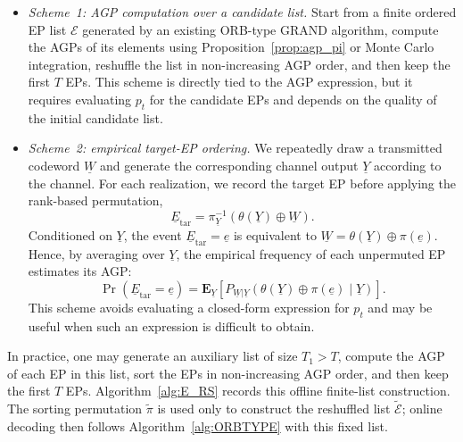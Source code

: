 \documentclass[letterpaper,draftclsnofoot,onecolumn]{IEEEtran}
\begin{document}
\begin{itemize}
    \item \textit{Scheme~1: AGP computation over a candidate list.}
    Start from a finite ordered EP list $\mathcal{E}$ generated by an existing ORB-type GRAND algorithm, compute the AGPs of its elements using Proposition~\ref{prop:agp_pi} or Monte Carlo integration, reshuffle the list in non-increasing AGP order, and then keep the first $T$ EPs. This scheme is directly tied to the AGP expression, but it requires evaluating $p_t$ for the candidate EPs and depends on the quality of the initial candidate list.
    \item \textit{Scheme~2: empirical target-EP ordering.}
    We repeatedly draw a transmitted codeword $\underline{W}$ and generate the corresponding channel output $\underline{Y}$ according to the channel. For each realization, we record the target EP before applying the rank-based permutation,
    \begin{equation}
        \underline{E}_{\mathrm{tar}}
        =
        \pi_{\underline{Y}}^{-1}\!\left(\theta(\underline{Y})\oplus \underline{W}\right).
    \end{equation}
    Conditioned on $\underline{Y}$, the event $\underline{E}_{\mathrm{tar}}=\underline{e}$ is equivalent to $\underline{W}=\theta(\underline{Y})\oplus\pi(\underline{e})$. Hence, by averaging over $\underline{Y}$, the empirical frequency of each unpermuted EP estimates its AGP:
    \begin{equation}
        \Pr(\underline{E}_{\mathrm{tar}}=\underline{e})
        =
        \mathbf{E}_{\underline{Y}}\!\left[
        P_{\underline{W}|\underline{Y}}\!\left(
        \theta(\underline{Y})\oplus \pi(\underline{e})\mid \underline{Y}
        \right)\right].
    \end{equation}
    This scheme avoids evaluating a closed-form expression for $p_t$ and may be useful when such an expression is difficult to obtain.
\end{itemize}

In practice, one may generate an auxiliary list of size $T_1>T$, compute the AGP of each EP in this list, sort the EPs in non-increasing AGP order, and then keep the first $T$ EPs. Algorithm~\ref{alg:E_RS} records this offline finite-list construction. The sorting permutation $\widetilde{\pi}$ is used only to construct the reshuffled list $\widetilde{\mathcal{E}}$; online decoding then follows Algorithm~\ref{alg:ORBTYPE} with this fixed list.
\end{document}
